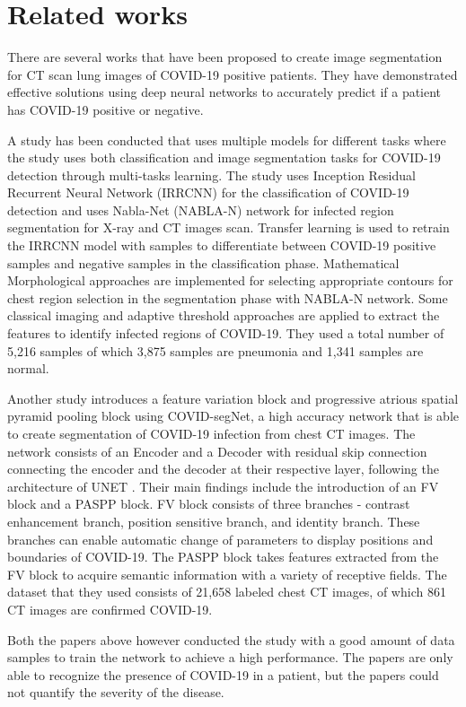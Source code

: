 \section{Related works}

There are several works that have been proposed to create image segmentation for CT scan lung images of COVID-19 positive patients. They have demonstrated effective solutions using deep neural networks to accurately predict if a patient has COVID-19 positive or negative. 

A study has been conducted that uses multiple models for different tasks where the study uses both classification and image segmentation tasks for COVID-19 detection through multi-tasks learning. The study uses Inception Residual Recurrent Neural Network (IRRCNN) for the classification of COVID-19 detection and uses Nabla-Net (NABLA-N) network for infected region segmentation for X-ray and CT images scan. \cite{ref1} Transfer learning is used to retrain the IRRCNN model with samples to differentiate between COVID-19 positive samples and negative samples in the classification phase. Mathematical Morphological approaches are implemented for selecting appropriate contours for chest region selection in the segmentation phase with NABLA-N network. Some classical imaging and adaptive threshold approaches are applied to extract the features to identify infected regions of COVID-19. They used a total number of 5,216 samples of which 3,875 samples are pneumonia and 1,341 samples are normal.

Another study \cite{ref2} introduces a feature variation block and progressive atrious spatial pyramid pooling block using COVID-segNet, a high accuracy network that is able to create segmentation of COVID-19 infection from chest CT images. The network consists of an Encoder and a Decoder with residual skip connection connecting the encoder and the decoder at their respective layer, following the architecture of UNET \cite{ref3}. Their main findings include the introduction of an FV block and a PASPP block. FV block consists of three branches - contrast enhancement branch, position sensitive branch, and identity branch. These branches can enable automatic change of parameters to display positions and boundaries of COVID-19. The PASPP block takes features extracted from the FV block to acquire semantic information with a variety of receptive fields. The dataset that they used consists of 21,658 labeled chest CT images, of which 861 CT images are confirmed COVID-19. 

Both the papers above however conducted the study with a good amount of data samples to train the network to achieve a high performance. The papers are only able to recognize the presence of COVID-19 in a patient, but the papers could not quantify the severity of the disease. 

